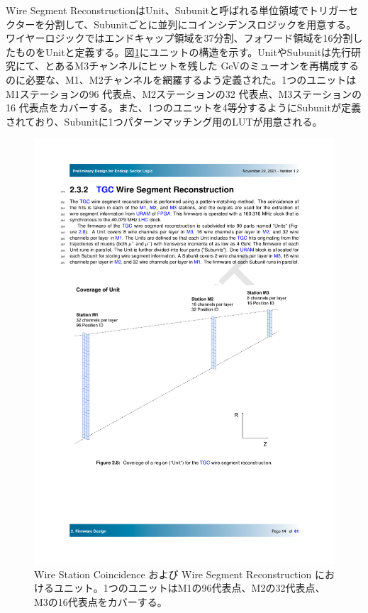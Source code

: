 Wire Segment ReconstructionはUnit、Subunitと呼ばれる単位領域でトリガーセクターを分割して、Subunitごとに並列にコインシデンスロジックを用意する。ワイヤーロジックではエンドキャップ領域を37分割、フォワード領域を16分割したものをUnitと定義する。図\ref{StationCoin_unit}にユニットの構造を示す。UnitやSubunitは先行研究にて、とあるM3チャンネルにヒットを残した  GeVのミューオンを再構成するのに必要な、M1、M2チャンネルを網羅するよう定義された。1つのユニットはM1ステーションの96 代表点、M2ステーションの32 代表点、M3ステーションの16 代表点をカバーする。また、1つのユニットを4等分するようにSubunitが定義されており、Subunitに1つパターンマッチング用のLUTが用意される。

\begin{figure} 
    \centering
    \includegraphics[width=12cm]{fig/SL/StationCoin_unit.pdf}
    \caption[Wire Station Coincidence および Wire Segment Reconstruction におけるユニット。1つのユニットはM1の96代表点、M2の32代表点、M3の16代表点をカバーする。]{Wire Station Coincidence および Wire Segment Reconstruction におけるユニット。1つのユニットはM1の96代表点、M2の32代表点、M3の16代表点をカバーする。\cite{SLPDR}}
    \label{StationCoin_unit}
\end{figure}

